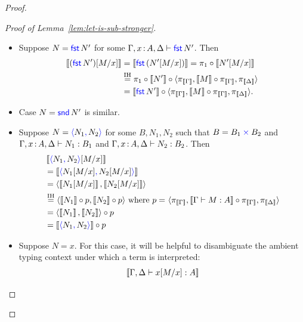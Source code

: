 \begin{proof}
\begin{proof}[Proof of Lemma~\ref{lem:let-is-sub-stronger}]
\begin{itemize}
\begin{align*}
        \llbr{\plunit[M/x]} &= \llbr{\plunit} = \angled{}
        = \angled{} \circ \angled{\pi_{\llbr{\Gamma}}, \llbr{M}\circ\pi_{\llbr{\Gamma}}, \pi_{\llbr{\Delta}}} \\
        &= \llbr{\plunit} \circ \angled{\pi_{\llbr{\Gamma}}, \llbr{M}\circ\pi_{\llbr{\Gamma}}, \pi_{\llbr{\Delta}}}.
      \end{align*}
    \item Suppose \(N = \mathsf{{\color{blue}fst}}\,N'\) for some \(\Gamma,x\,{:}\, A,\Delta \vdash \mathsf{{\color{blue}fst}}\,N'\).
      Then
      \begin{align*}
        \left\llbracket (\mathsf{{\color{blue}fst}}\,N')[M/x]\right\rrbracket
        &= \left\llbracket \mathsf{{\color{blue}fst}}\,(N'[M/x])\right\rrbracket
        = \pi_1 \circ \left\llbracket N'[M/x]\right\rrbracket \\
        &\stackrel{\text{IH}}=
        \pi_1 \circ \left\llbracket N'\right\rrbracket \circ \langle \pi_{\left\llbracket \Gamma\right\rrbracket}, \left\llbracket M\right\rrbracket\circ\pi_{\left\llbracket \Gamma\right\rrbracket}, \pi_{\left\llbracket \Delta\right\rrbracket}\rangle \\
        &= \left\llbracket \mathsf{{\color{blue}fst}}\,N'\right\rrbracket \circ\langle \pi_{\left\llbracket \Gamma\right\rrbracket}, \left\llbracket M\right\rrbracket\circ\pi_{\left\llbracket \Gamma\right\rrbracket}, \pi_{\left\llbracket \Delta\right\rrbracket}\rangle.
      \end{align*}
    \item Case \(N = \mathsf{{\color{blue}snd}}\,N'\) is similar.
    \item Suppose \(N = \plpair{N_1}{N_2}\) for some \(B,N_1,N_2\) such that \(B = B_1\mathbin{{\color{blue}\times}} B_2\) and
      \(\Gamma,x\,{:}\, A,\Delta \vdash N_1 : B_1\)
      and \(\Gamma,x\,{:}\, A,\Delta \vdash N_2 : B_2\).
      Then
      \begin{align*}
        &\llbr{\plpair{N_1}{N_2}[M/x]}
        \\
        &=
        \llbr{\plpair{N_1[M/x]}{N_2[M/x]}}
        \\
        &=
        \angled{\llbr{N_1[M/x]},\llbr{N_2[M/x]}}
        \\
        &\stackrel{\text{IH}}=
        \angled{\llbr{N_1}\circ p,\llbr{N_2} \circ p}
        \text{ where \(p =\) }\angled{\pi_{\llbr{\Gamma}},
          \llbr{\Gamma \vdash M : A}\circ\pi_{\llbr{\Gamma}},
          \pi_{\llbr{\Delta}}}
        \\
        &= \angled{\llbr{N_1},\llbr{N_2}} \circ p\\
        &= \llbr{\plpair{N_1}{N_2}} \circ p
      \end{align*}
    \item Suppose \(N = x\).
      For this case, it will be helpful to disambiguate the ambient typing context under which a term is interpreted:
      \begin{align*}
        &\llbr{\Gamma,\Delta \vdash x[M/x] : A} \\

\end{align*}
\end{itemize}
\end{proof}
\end{proof}
